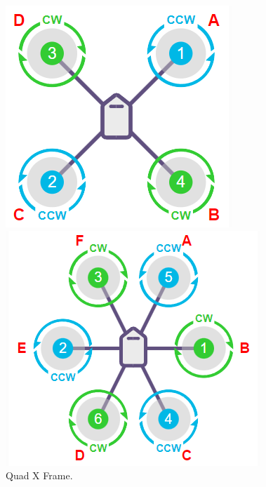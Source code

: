     \begin{figure}[h!]
        \centering
        \begin{minipage}[b]{0.4\textwidth}
            \includegraphics[width=\textwidth]{pictures/quad_frame.png}
            \caption{Quad X Frame.}
            \label{fig:quad_frame}
        \end{minipage}
        \hfill
        \begin{minipage}[b]{0.4\textwidth}
            \includegraphics[width=\textwidth]{pictures/hexa_frame.png}

\end{minipage}
\end{figure}
